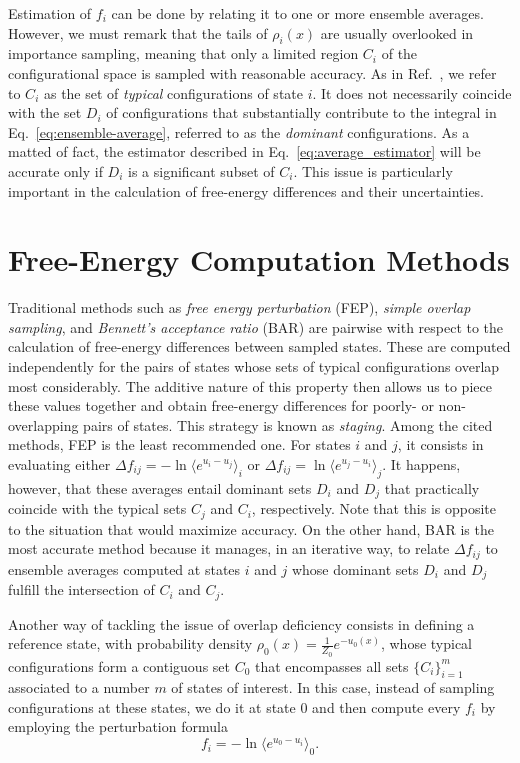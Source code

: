 \documentclass[aip,jcp,reprint,amsmath,amssymb]{revtex4-1}
\begin{document}
Estimation of $f_i$ can be done by relating it to one or more ensemble averages. However, we must remark that the tails of $\rho_i(x)$ are usually overlooked in importance sampling, meaning that only a limited region $C_i$ of the configurational space is sampled with reasonable accuracy. As in Ref.~, we refer to $C_i$ as the set of \textit{typical} configurations of state $i$. It does not necessarily coincide with the set $D_i$ of configurations that substantially contribute to the integral in Eq.~\eqref{eq:ensemble-average}, referred to as the \textit{dominant} configurations. As a matted of fact, the estimator described in Eq.~\eqref{eq:average_estimator} will be accurate only if $D_i$ is a significant subset of $C_i$. This issue is particularly important in the calculation of free-energy differences and their uncertainties.

\section{Free-Energy Computation Methods}

Traditional methods such as \textit{free energy perturbation} (FEP),\cite{Zwanzig_1954} \textit{simple overlap sampling},\cite{Lee_1980, Lu_2003} and \textit{Bennett's acceptance ratio} (BAR)\cite{Bennett_1976} are pairwise with respect to the calculation of free-energy differences between sampled states. These are computed independently for the pairs of states whose sets of typical configurations overlap most considerably. The additive nature of this property then allows us to piece these values together and obtain free-energy differences for poorly- or non-overlapping pairs of states. This strategy is known as \textit{staging}.\cite{Kofke_1998} Among the cited methods, FEP is the least recommended one. For states $i$ and $j$, it consists in evaluating either $\Delta f_{ij} = -\ln \langle e^{u_i - u_j} \rangle_i$ or $\Delta f_{ij} = \ln \langle e^{u_j - u_i} \rangle_j$.\cite{Zwanzig_1954} It happens, however, that these averages entail dominant sets $D_i$ and $D_j$ that practically coincide with the typical sets $C_j$ and $C_i$, respectively.\cite{Jarzynski_2006} Note that this is opposite to the situation that would maximize accuracy. On the other hand, BAR is the most accurate method because it manages, in an iterative way, to relate $\Delta f_{ij}$ to ensemble averages computed at states $i$ and $j$ whose dominant sets $D_i$ and $D_j$ fulfill the intersection of $C_i$ and $C_j$.

Another way of tackling the issue of overlap deficiency consists in defining a reference state, with probability density $\rho_0(x) = \frac{1}{Z_0}e^{-u_0(x)}$, whose typical configurations form a contiguous set $C_0$ that encompasses all sets $\{C_i\}_{i=1}^m$ associated to a number $m$ of states of interest. In this case, instead of sampling configurations at these states, we do it at state $0$ and then compute every $f_i$ by employing the perturbation formula
\begin{equation}
\label{eq:umbrella sampling free energy}
f_i = -\ln \langle e^{u_0-u_i} \rangle_0.
\end{equation}
\end{document}

